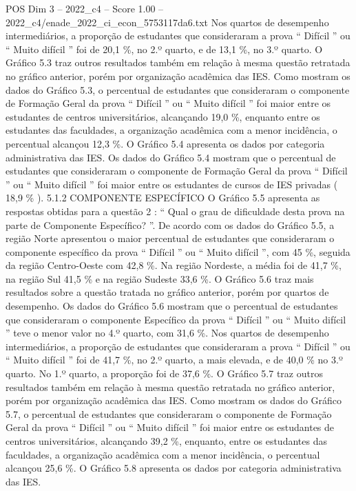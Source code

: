\begin{textsample}{POS Dim 3 – 2022\_c4 – Score 1.00 – 2022\_c4/enade\_2022\_ci\_econ\_5753117da6.txt}
Nos quartos de desempenho intermediários, a proporção de estudantes que consideraram a prova “ Difícil ” ou “ Muito difícil ” foi de 20,1 \%, no 2.º quarto, e de 13,1 \%, no 3.º quarto.
O Gráfico 5.3 traz outros resultados também em relação à mesma questão retratada no gráfico anterior, porém por organização acadêmica das IES.
Como mostram os dados do Gráfico 5.3, o percentual de estudantes que consideraram o componente de Formação Geral da prova “ Difícil ” ou “ Muito difícil ” foi maior entre os estudantes de centros universitários, alcançando 19,0 \%, enquanto entre os estudantes das faculdades, a organização acadêmica com a menor incidência, o percentual alcançou 12,3 \%.
O Gráfico 5.4 apresenta os dados por categoria administrativa das IES.
Os dados do Gráfico 5.4 mostram que o percentual de estudantes que consideraram o componente de Formação Geral da prova “ Difícil ” ou “ Muito difícil ” foi maior entre os estudantes de cursos de IES privadas ( 18,9 \% ). 5.1.2 COMPONENTE ESPECÍFICO O Gráfico 5.5 apresenta as respostas obtidas para a questão 2 : “ Qual o grau de dificuldade desta prova na parte de Componente Específico? ”.
De acordo com os dados do Gráfico 5.5, a região Norte apresentou o maior percentual de estudantes que consideraram o componente específico da prova “ Difícil ” ou “ Muito difícil ”, com 45 \%, seguida da região Centro-Oeste com 42,8 \%.
Na região Nordeste, a média foi de 41,7 \%, na região Sul 41,5 \% e na região Sudeste 33,6 \%.
O Gráfico 5.6 traz mais resultados sobre a questão tratada no gráfico anterior, porém por quartos de desempenho.
Os dados do Gráfico 5.6 mostram que o percentual de estudantes que consideraram o componente Específico da prova “ Difícil ” ou “ Muito difícil ” teve o menor valor no 4.º quarto, com 31,6 \%.
Nos quartos de desempenho intermediários, a proporção de estudantes que consideraram a prova “ Difícil ” ou “ Muito difícil ” foi de 41,7 \%, no 2.º quarto, a mais elevada, e de 40,0 \% no 3.º quarto.
No 1.º quarto, a proporção foi de 37,6 \%.
O Gráfico 5.7 traz outros resultados também em relação à mesma questão retratada no gráfico anterior, porém por organização acadêmica das IES.
Como mostram os dados do Gráfico 5.7, o percentual de estudantes que consideraram o componente de Formação Geral da prova “ Difícil ” ou “ Muito difícil ” foi maior entre os estudantes de centros universitários, alcançando 39,2 \%, enquanto, entre os estudantes das faculdades, a organização acadêmica com a menor incidência, o percentual alcançou 25,6 \%.
O Gráfico 5.8 apresenta os dados por categoria administrativa das IES.

\end{textsample}
